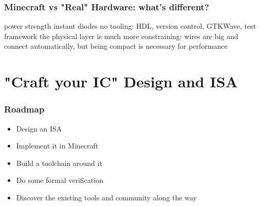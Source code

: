 \documentclass[aspectratio=169]{beamer}
\begin{document}
\begin{frame}
	\frametitle{Minecraft vs "Real" Hardware: what's different?}
	power strength
	instant diodes
	no tooling: HDL, version control, GTKWave, test framework
	the physical layer is much more constraining: wires are big and connect automatically, but being compact is necessary for performance
\end{frame}

\section{"Craft your IC" Design and ISA}


\begin{frame}
	\frametitle{Roadmap}

	\begin{itemize}
		\item Design an ISA
		\item Implement it in Minecraft
		\item Build a toolchain around it
		\item Do some formal verification
		\item Discover the existing tools and community along the way
	\end{itemize}


\end{frame}
\end{document}
